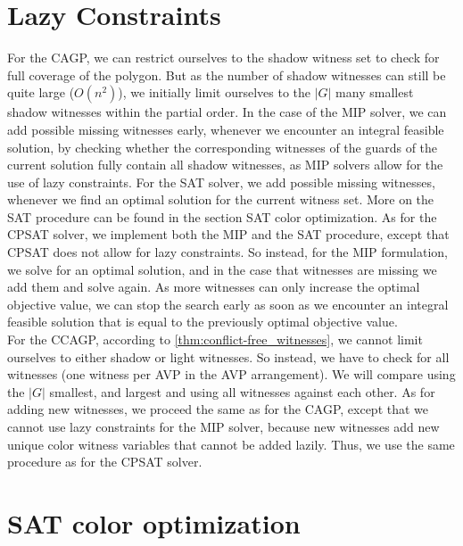 \section{Lazy Constraints}
For the CAGP, we can restrict ourselves to the shadow witness set to check for full coverage of the polygon. But as the number of shadow witnesses can still be quite large ($O(n^2)$), we initially limit ourselves to the $|G|$ many smallest shadow witnesses within the partial order. In the case of the MIP solver, we can add possible missing witnesses early, whenever we encounter an integral feasible solution, by checking whether the corresponding witnesses of the guards of the current solution fully contain all shadow witnesses, as MIP solvers allow for the use of lazy constraints. For the SAT solver, we add possible missing witnesses, whenever we find an optimal solution for the current witness set. More on the SAT procedure can be found in the section SAT color optimization. As for the CPSAT solver, we implement both the MIP and the SAT procedure, except that CPSAT does not allow for lazy constraints. So instead, for the MIP formulation, we solve for an optimal solution, and in the case that witnesses are missing we add them and solve again. As more witnesses can only increase the optimal objective value, we can stop the search early as soon as we encounter an integral feasible solution that is equal to the previously optimal objective value.\\
For the CCAGP, according to \cref{thm:conflict-free_witnesses}, we cannot limit ourselves to either shadow or light witnesses. So instead, we have to check for all witnesses (one witness per AVP in the AVP arrangement). We will compare using the $|G|$ smallest, and largest and using all witnesses against each other. As for adding new witnesses, we proceed the same as for the CAGP, except that we cannot use lazy constraints for the MIP solver, because new witnesses add new unique color witness variables that cannot be added lazily. Thus, we use the same procedure as for the CPSAT solver.

\section{SAT color optimization}
